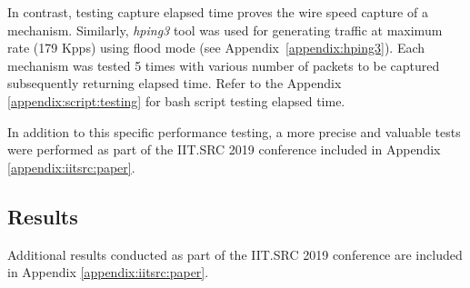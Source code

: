 \documentclass[12pt,a4paper,twoside]{book}
\begin{document}
            In contrast, testing capture elapsed time proves the wire speed capture of a mechanism. Similarly, \emph{hping3} tool was used for generating traffic at maximum rate (179 Kpps) using flood mode (see Appendix~\ref{appendix:hping3}). Each mechanism was tested 5 times with various number of packets to be captured subsequently returning elapsed time. Refer to the Appendix \ref{appendix:script:testing} for bash script testing elapsed time.\par
            In addition to this specific performance testing, a more precise and valuable tests were performed as part of the IIT.SRC 2019 conference included in Appendix \ref{appendix:iitsrc:paper}.
        \subsection{Results} \label{analysis:testing:results}
            Additional results conducted as part of the IIT.SRC 2019 conference are included in Appendix \ref{appendix:iitsrc:paper}.
\end{document}
